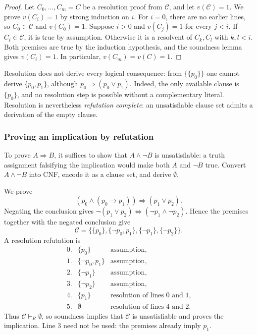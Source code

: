 \documentclass[11pt,a4paper]{amsart}
\begin{document}
\begin{proof}
  Let \(C_0,\ldots,C_m=C\) be a resolution proof from \(\mathcal C\), and
  let \(v(\mathcal C)=1\). We prove \(v(C_i)=1\) by strong induction on \(i\).
  For \(i=0\), there are no earlier lines, so \(C_0\in\mathcal C\) and
  \(v(C_0)=1\). Suppose \(i>0\) and \(v(C_j)=1\) for every \(j<i\).
  If \(C_i\in\mathcal C\), it is true by assumption. Otherwise it is a
  resolvent of \(C_k,C_l\) with \(k,l<i\). Both premises are true by the
  induction hypothesis, and the soundness lemma gives \(v(C_i)=1\).
  In particular, \(v(C_m)=v(C)=1\).
\end{proof}

\begin{remark}
  Resolution does not derive every logical consequence: from
  \(\{\{p_0\}\}\) one cannot derive \(\{p_0,p_1\}\), although
  \(p_0\Rightarrow(p_0\lor p_1)\). Indeed, the only available clause is
  \(\{p_0\}\), and no resolution step is possible without a complementary
  literal. Resolution is nevertheless \emph{refutation complete}: an
  unsatisfiable clause set admits a derivation of the empty clause.
\end{remark}

\subsubsection{Proving an implication by refutation}

To prove \(A\Rightarrow B\), it suffices to show that \(A\land\neg B\)
is unsatisfiable: a truth assignment falsifying the implication would make
both \(A\) and \(\neg B\) true. Convert \(A\land\neg B\) into CNF,
encode it as a clause set, and derive \(\emptyset\).

\begin{example}
  We prove
  \[
    (p_0\land(p_0\rightarrow p_1))\Rightarrow(p_1\lor p_2).
  \]
  Negating the conclusion gives
  \(\neg(p_1\lor p_2)\Leftrightarrow(\neg p_1\land\neg p_2)\).
  Hence the premises together with the negated conclusion give
  \[
    \mathcal C=
    \bigl\{\{p_0\},\{\neg p_0,p_1\},\{\neg p_1\},\{\neg p_2\}\bigr\}.
  \]
  A resolution refutation is
  \[
    \begin{array}{rll}
      0.&\{p_0\}&\text{assumption},\\
      1.&\{\neg p_0,p_1\}&\text{assumption},\\
      2.&\{\neg p_1\}&\text{assumption},\\
      3.&\{\neg p_2\}&\text{assumption},\\
      4.&\{p_1\}&\text{resolution of lines 0 and 1},\\
      5.&\emptyset&\text{resolution of lines 4 and 2}.
    \end{array}
  \]
  Thus \(\mathcal C\vdash_R\emptyset\), so soundness implies that
  \(\mathcal C\) is unsatisfiable and proves the implication. Line 3 need
  not be used: the premises already imply \(p_1\).
\end{example}
\end{document}
